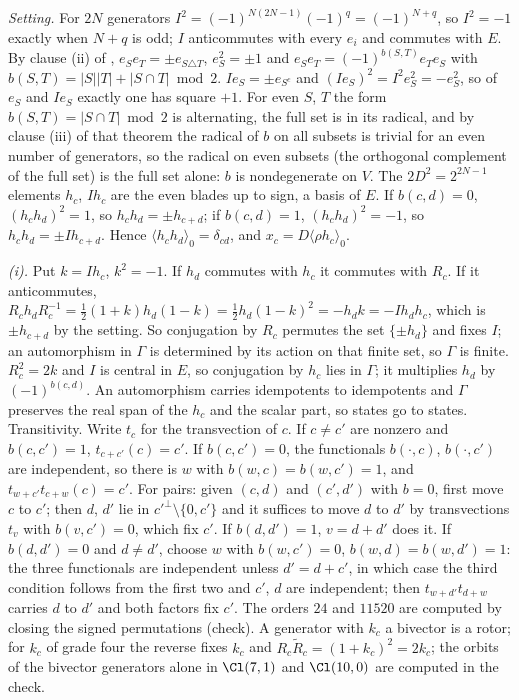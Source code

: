 \emph{Setting.} For $2N$ generators $I^{2} = (-1)^{N(2N-1)}(-1)^{q} = (-1)^{N+q}$, so $I^{2} = -1$ exactly when $N + q$ is odd; $I$ anticommutes with every $e_{i}$ and commutes with $E$. By clause (ii) of , $e_{S}e_{T} = \pm e_{S\triangle T}$, $e_{S}^{2} = \pm 1$ and $e_{S}e_{T} = (-1)^{b(S,T)}e_{T}e_{S}$ with $b(S,T) = |S||T| + |S\cap T| \bmod 2$. $Ie_{S} = \pm e_{S^{c}}$ and $(Ie_{S})^{2} = I^{2}e_{S}^{2} = -e_{S}^{2}$, so of $e_{S}$ and $Ie_{S}$ exactly one has square $+1$. For even $S$, $T$ the form $b(S,T) = |S\cap T| \bmod 2$ is alternating, the full set is in its radical, and by clause (iii) of that theorem the radical of $b$ on all subsets is trivial for an even number of generators, so the radical on even subsets (the orthogonal complement of the full set) is the full set alone: $b$ is nondegenerate on $V$. The $2D^{2} = 2^{2N-1}$ elements $h_{c}$, $Ih_{c}$ are the even blades up to sign, a basis of $E$. If $b(c,d) = 0$, $(h_{c}h_{d})^{2} = 1$, so $h_{c}h_{d} = \pm h_{c+d}$; if $b(c,d) = 1$, $(h_{c}h_{d})^{2} = -1$, so $h_{c}h_{d} = \pm Ih_{c+d}$. Hence $\langle h_{c}h_{d}\rangle_{0} = \delta_{cd}$, and $x_{c} = D\langle\rho h_{c}\rangle_{0}$.

\emph{(i).} Put $k = Ih_{c}$, $k^{2} = -1$. If $h_{d}$ commutes with $h_{c}$ it commutes with $R_{c}$. If it anticommutes, $R_{c}h_{d}R_{c}^{-1} = \tfrac12(1 + k)h_{d}(1 - k) = \tfrac12 h_{d}(1 - k)^{2} = -h_{d}k = -Ih_{d}h_{c}$, which is $\pm h_{c+d}$ by the setting. So conjugation by $R_{c}$ permutes the set $\{\pm h_{d}\}$ and fixes $I$; an automorphism in $\Gamma$ is determined by its action on that finite set, so $\Gamma$ is finite. $R_{c}^{2} = 2k$ and $I$ is central in $E$, so conjugation by $h_{c}$ lies in $\Gamma$; it multiplies $h_{d}$ by $(-1)^{b(c,d)}$. An automorphism carries idempotents to idempotents and $\Gamma$ preserves the real span of the $h_{c}$ and the scalar part, so states go to states. Transitivity. Write $t_{c}$ for the transvection of $c$. If $c \ne c'$ are nonzero and $b(c,c') = 1$, $t_{c+c'}(c) = c'$. If $b(c,c') = 0$, the functionals $b(\cdot,c)$, $b(\cdot,c')$ are independent, so there is $w$ with $b(w,c) = b(w,c') = 1$, and $t_{w+c'}t_{c+w}(c) = c'$. For pairs: given $(c,d)$ and $(c',d')$ with $b = 0$, first move $c$ to $c'$; then $d$, $d'$ lie in $c'^{\perp}\setminus\{0, c'\}$ and it suffices to move $d$ to $d'$ by transvections $t_{v}$ with $b(v,c') = 0$, which fix $c'$. If $b(d,d') = 1$, $v = d + d'$ does it. If $b(d,d') = 0$ and $d \ne d'$, choose $w$ with $b(w,c') = 0$, $b(w,d) = b(w,d') = 1$: the three functionals are independent unless $d' = d + c'$, in which case the third condition follows from the first two and $c'$, $d$ are independent; then $t_{w+d'}t_{d+w}$ carries $d$ to $d'$ and both factors fix $c'$. The orders $24$ and $11520$ are computed by closing the signed permutations (check). A generator with $k_{c}$ a bivector is a rotor; for $k_{c}$ of grade four the reverse fixes $k_{c}$ and $R_{c}\tilde R_{c} = (1 + k_{c})^{2} = 2k_{c}$; the orbits of the bivector generators alone in $\Cl(7,1)$ and $\Cl(10,0)$ are computed in the check.

